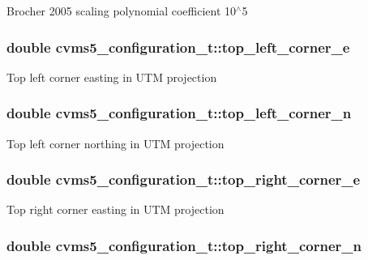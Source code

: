 Brocher 2005 scaling polynomial coefficient 10$^\wedge$5 \hypertarget{structcvms5__configuration__t_a972f0043de07521ed4334cee27505390}{
\subsubsection[{top\+\_\+left\+\_\+corner\+\_\+e}]{\setlength{\rightskip}{0pt plus 5cm}double cvms5\+\_\+configuration\+\_\+t\+::top\+\_\+left\+\_\+corner\+\_\+e}}\label{structcvms5__configuration__t_a972f0043de07521ed4334cee27505390}
Top left corner easting in U\+T\+M projection \hypertarget{structcvms5__configuration__t_a4f3476d91bed8bc9d4b36838d5f40053}{
\subsubsection[{top\+\_\+left\+\_\+corner\+\_\+n}]{\setlength{\rightskip}{0pt plus 5cm}double cvms5\+\_\+configuration\+\_\+t\+::top\+\_\+left\+\_\+corner\+\_\+n}}\label{structcvms5__configuration__t_a4f3476d91bed8bc9d4b36838d5f40053}
Top left corner northing in U\+T\+M projection \hypertarget{structcvms5__configuration__t_aaac7648dfa75759896e58efaaba005cb}{
\subsubsection[{top\+\_\+right\+\_\+corner\+\_\+e}]{\setlength{\rightskip}{0pt plus 5cm}double cvms5\+\_\+configuration\+\_\+t\+::top\+\_\+right\+\_\+corner\+\_\+e}}\label{structcvms5__configuration__t_aaac7648dfa75759896e58efaaba005cb}
Top right corner easting in U\+T\+M projection \hypertarget{structcvms5__configuration__t_ae9209d39f78932c177affef1b738adf5}{
\subsubsection[{top\+\_\+right\+\_\+corner\+\_\+n}]{\setlength{\rightskip}{0pt plus 5cm}double cvms5\+\_\+configuration\+\_\+t\+::top\+\_\+right\+\_\+corner\+\_\+n}}\label{structcvms5__configuration__t_ae9209d39f78932c177affef1b738adf5}

